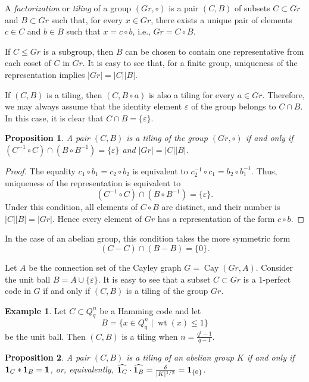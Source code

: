 \documentclass[11pt]{article}
\newtheorem{claim}{Proposition}[section]
\theoremstyle{definition}
\newtheorem{example}{Example}[section]
\begin{document}
{{{%
A  {\sl factorization} or {\sl tiling} of a group $(Gr,\circ)$ is a
pair $(C,B)$ of subsets $C\subset Gr$ and $B\subset Gr$ such that,
for every $x\in Gr$, there exists a unique pair of elements
$c\in C$ and $b\in B$ such that
$x=c\circ b$,
i.e.,
$Gr=C\circ B$.

If $C\leq Gr$ is a subgroup, then $B$ can be chosen to contain one
representative from each coset of $C$ in $Gr$. It is easy to see that,
for a finite group, uniqueness of the representation implies
$|Gr|=|C||B|$.


If $(C,B)$ is a tiling, then $(C,B\circ a)$ is also a tiling for every
$a\in Gr$. Therefore, we may always assume that the identity element
$\varepsilon$ of the group belongs to $C\cap B$. In this case, it is
clear that
$C\cap B=\{\varepsilon\}$.


\begin{claim}
A pair $(C,B)$ is a tiling of the group $(Gr,\circ)$ if and only if
$(C^{-1}\circ C)\cap(B\circ B^{-1})=\{\varepsilon\}$ 
and
$|Gr|=|C||B|$.
\end{claim}

\begin{proof}
The equality
$c_1\circ b_1=c_2\circ b_2
$
is equivalent to
$
c_2^{-1}\circ c_1=b_2\circ b_1^{-1}$.
Thus, uniqueness of the representation is equivalent to
\[
(C^{-1}\circ C)\cap(B\circ B^{-1})=\{\varepsilon\}.
\]
Under this condition, all elements of $C\circ B$ are distinct, and
their number is $|C||B|=|Gr|$. Hence every element of $Gr$ has a
representation of the form $c\circ b$.
\end{proof}

In the case of an abelian group, this condition takes the more
symmetric form
\[
(C-C)\cap(B-B)=\{0\}.
\]

Let $A$ be the connection set of the Cayley graph
$G=\operatorname{Cay}(Gr,A)$. Consider the unit ball
$B=A\cup\{\varepsilon\}$.
It is easy to see that a subset $C\subset Gr$ is a $1$-perfect code in
$G$ if and only if $(C,B)$ is a tiling of the group $Gr$.

\begin{example}
Let $C\subset Q_q^n$ be a Hamming code and let
\[
B=\{x\in Q_q^n\mid \operatorname{wt}(x)\leq1\}
\]
be the unit ball. Then $(C,B)$ is a tiling when
$n=\frac{q^t-1}{q-1}$.
\end{example}

\begin{claim}\label{cl:tiling}
A pair $(C,B)$ is a tiling of an abelian group $K$ if and only if
$
{\mathbf 1}_C*{\mathbf 1}_B={\bf 1}$,
or, equivalently,
$\widehat{{\mathbf 1}_C}\cdot\widehat{{\mathbf 1}_B}=\frac{\delta}{|K|^{1/2}}={\bf 1}_{\{0\}}$.
\end{claim}

}}}
\end{document}
